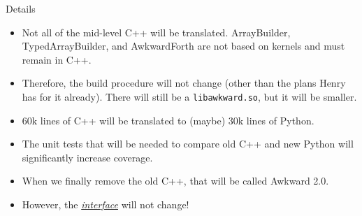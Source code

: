 \documentclass[aspectratio=169]{beamer}
\begin{document}
\begin{frame}{Details}
\vspace{0.5 cm}

\begin{itemize}\setlength{\itemsep}{0.5 cm}
\item Not all of the mid-level C++ will be translated. ArrayBuilder, TypedArrayBuilder, and AwkwardForth are not based on kernels and must remain in C++.
\item Therefore, the build procedure will not change (other than the plans Henry has for it already). There will still be a \texttt{libawkward.so}, but it will be smaller.
\item 60k lines of C++ will be translated to (maybe) 30k lines of Python.
\item The unit tests that will be needed to compare old C++ and new Python will significantly increase coverage.
\item When we finally remove the old C++, that will be called Awkward 2.0.
\item However, the \underline{\it interface} will not change!
\end{itemize}
\end{frame}
\end{document}

